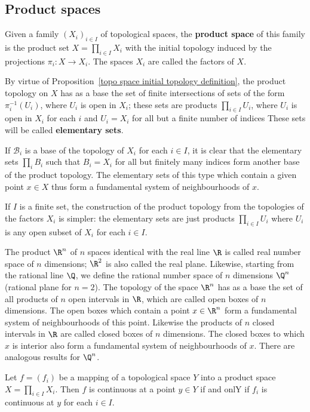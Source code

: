 \subsection{Product spaces}
\begin{definition}
Given a family $(X_i)_{i\in I}$ of topological spaces, the \textbf{product space} of this family is the product set $X=\prod_{i\in I}X_i$ with the initial topology induced by the projections $\pi_i:X\to X_i$. The spaces $X_i$ are called the factors of $X$.
\end{definition}
By virtue of Proposition~\ref{topo space initial topology definition}, the product topology on $X$ has as a base the set of finite intersections of sets of the form $\pi_i^{-1}(U_i)$, where $U_i$ is open in $X_i$; these sets are products $\prod_{i\in I}U_i$, where $U_i$ is open in $X_i$ for each $i$ and $U_i=X_i$ for all but a finite number of indices These sets will be called \textbf{elementary sets}.\par
If $\mathcal{B}_i$ is a base of the topology of $X_i$ for each $i\in I$, it is clear that the elementary sets $\prod_iB_i$ such that $B_i=X_i$ for all but finitely many indices form another base of the product topology. The elementary sets of this type which contain a given point $x\in X$ thus form a fundamental system of neighbourhoods of $x$.\par
If $I$ is a finite set, the construction of the product topology from the topologies of the factors $X_i$ is simpler: the elementary sets are just products $\prod_{i\in I}U_i$ where $U_i$ is any open subset of $X_i$ for each $i\in I$.
\begin{example}
The product $\R^n$ of $n$ spaces identical with the real line $\R$ is called real number space of $n$ dimensions; $\R^2$ is also called the real plane. Likewise, starting from the rational line $\Q$, we define the rational number space of $n$ dimensions $\Q^n$ (rational plane for $n=2$). The topology of the space $\R^n$ has as a base the set of all products of $n$ open intervals in $\R$, which are called open boxes of $n$ dimensions. The open boxes which contain a point $x\in\R^n$ form a fundamental system of neighbourhoods of this point. Likewise the products of $n$ closed intervals in $\R$ are called closed boxes of $n$ dimensions. The closed boxes to which $x$ is interior also form a fundamental system of neighbourhoods of $x$. There are analogous results for $\Q^n$.
\end{example}
\begin{proposition}\label{topo space map into product continuous iff}
Let $f=(f_i)$ be a mapping of a topological space $Y$ into a product space $X=\prod_{i\in I}X_i$. Then $f$ is continuous at a point $y\in Y$ if and onlY if $f_i$ is continuous at $y$ for each $i\in I$.
\end{proposition}

